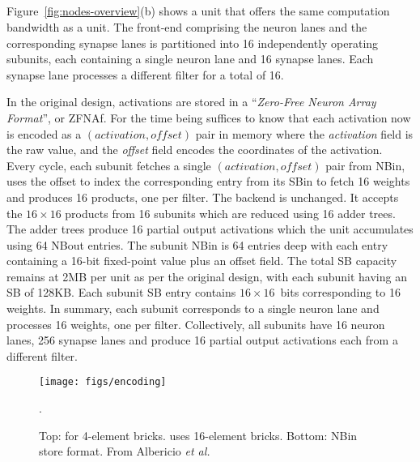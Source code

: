 \subsection{\ZFL}

Figure~\ref{fig:nodes-overview}(b) shows a \ZF unit that offers the same computation bandwidth as a \BASE unit. The front-end comprising the neuron lanes and the corresponding synapse lanes is partitioned into 16 independently operating subunits, each containing a single neuron lane and 16 synapse lanes. Each synapse lane processes a different filter for a total of 16.

In the original \ZF design, activations are stored in a ``\textit{Zero-Free Neuron Array Format}'', or ZFNAf. For the time being suffices to know that each activation now is encoded as a $(activation,offset)$ pair in memory where the \textit{activation} field is the raw value, and the \textit{offset }field encodes the coordinates of the activation. Every cycle, each subunit fetches a single $(activation,\mathit{offset})$ pair from NBin, uses the offset to index the corresponding entry from its SBin to fetch 16 weights and produces 16 products, one per filter. The backend is unchanged. It accepts the $16\times 16$ products from 16 subunits which are reduced using 16 adder trees. The adder trees produce 16 partial output activations which the unit accumulates using 64 NBout entries.  The subunit  NBin is 64 entries deep with each entry containing a 16-bit fixed-point value plus an offset field. The total SB capacity remains at 2MB per unit as per the original \BASE design, with each subunit having an SB of 128KB. Each subunit SB entry contains $16\times 16$~bits corresponding to 16 weights. In summary, each subunit corresponds to a single neuron lane and processes 16 weights,  one per filter. Collectively, all subunits have 16 neuron lanes, 256 synapse lanes and produce 16 partial output activations each from a different filter.

\begin{figure}[t]
\centering
\texttt{[image: figs/encoding]}
\caption{Top: \ZFNAf for 4-element bricks. \ZF uses 16-element bricks. Bottom: NBin store format. From Albericio  \textit{et al.}~\cite{cnvlutin}}.
\label{fig:encoding}
\end{figure}

